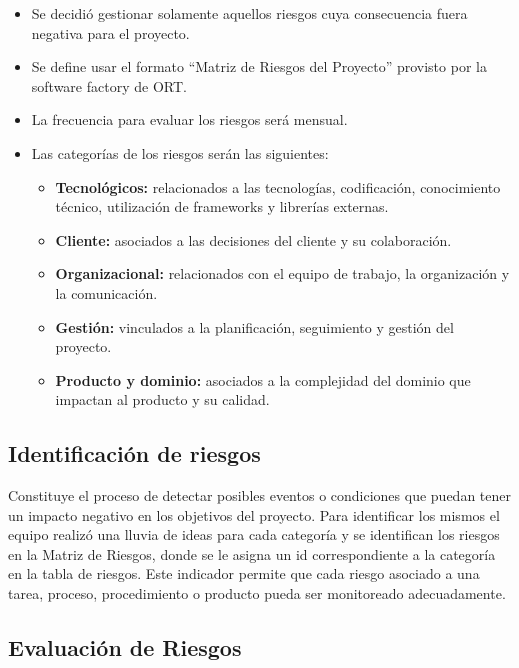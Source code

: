 \begin{itemize}
    \item Se decidió gestionar solamente aquellos riesgos cuya consecuencia fuera negativa para el proyecto.
    \item Se define usar el formato “Matriz de Riesgos del Proyecto” provisto por la software factory de ORT.
    \item La frecuencia para evaluar los riesgos será mensual.
    \item Las categorías de los riesgos serán las siguientes:
    \begin{itemize}
        \item \textbf{Tecnológicos:} relacionados a las tecnologías, codificación, conocimiento técnico, utilización de frameworks y librerías externas.
        \item \textbf{Cliente:} asociados a las decisiones del cliente y su colaboración.
        \item \textbf{Organizacional:} relacionados con el equipo de trabajo, la organización y la comunicación.
        \item \textbf{Gestión:} vinculados a la planificación, seguimiento y gestión del proyecto.
        \item \textbf{Producto y dominio:} asociados a la complejidad del dominio que impactan al producto y su calidad.
\end{itemize}
\end{itemize}

\subsection{Identificación de riesgos}\label{subsec:identificacionDeRiesgos}

Constituye el proceso de detectar posibles eventos o condiciones que puedan tener un impacto negativo en los objetivos del proyecto. Para identificar los 
mismos el equipo realizó una lluvia de ideas para cada categoría y se identifican los riesgos en la Matriz de Riesgos, donde se le asigna un id correspondiente 
a la categoría en la tabla de riesgos. Este indicador permite que cada riesgo asociado a una tarea, proceso, procedimiento o producto pueda ser monitoreado 
adecuadamente. 


\subsection{Evaluación de Riesgos}\label{subsec:evaluacionDeRiesgos}

